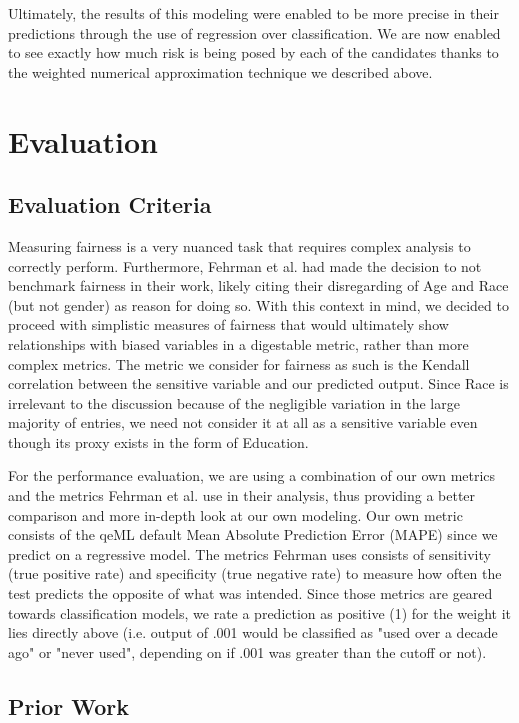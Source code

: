 \documentclass{article}
\begin{document}
    Ultimately, the results of this modeling were enabled to be more precise in their predictions through the use of regression over classification. We are now enabled to see exactly how much risk is being posed by each of the candidates thanks to the weighted numerical approximation technique we described above.


\section{Evaluation}
    \subsection{Evaluation Criteria}
    Measuring fairness is a very nuanced task that requires complex analysis to correctly perform. Furthermore, Fehrman et al. had made the decision to not benchmark fairness in their work, likely citing their disregarding of Age and Race (but not gender) as reason for doing so. With this context in mind, we decided to proceed with simplistic measures of fairness that would ultimately show relationships with biased variables in a digestable metric, rather than more complex metrics. The metric we consider for fairness as such is the Kendall correlation between the sensitive variable and our predicted output. Since Race is irrelevant to the discussion because of the negligible variation in the large majority of entries, we need not consider it at all as a sensitive variable even though its proxy exists in the form of Education.
    
    For the performance evaluation, we are using a combination of our own metrics and the metrics Fehrman et al. use in their analysis, thus providing a better comparison and more in-depth look at our own modeling. Our own metric consists of the qeML default Mean Absolute Prediction Error (MAPE) since we predict on a regressive model. The metrics Fehrman uses consists of sensitivity (true positive rate) and specificity (true negative rate) to measure how often the test predicts the opposite of what was intended. Since those metrics are geared towards classification models, we rate a prediction as positive (1) for the weight it lies directly above (i.e. output of .001 would be classified as "used over a decade ago" or "never used", depending on if .001 was greater than the cutoff or not).

    \subsection{Prior Work}
\end{document}
